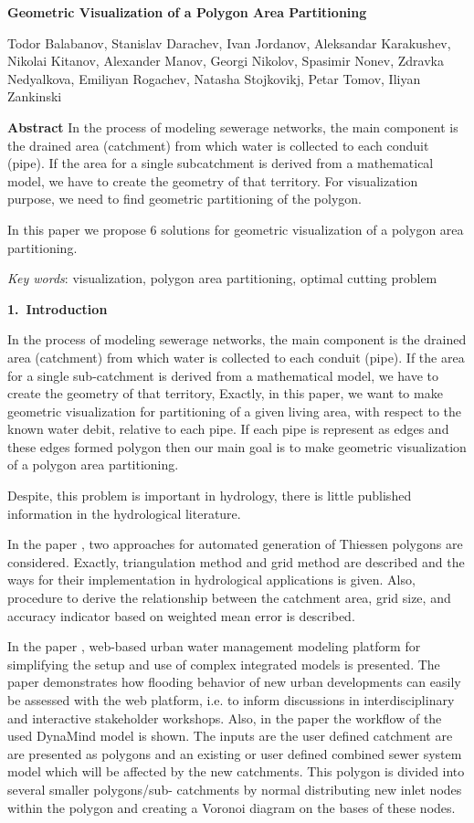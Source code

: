\documentclass[11pt,leqno]{book}
\newcommand{\sect}[1]{\vskip7mm\par{\large \bf #1}}
\begin{document}
%
\begin{center}
\textbf{\LARGE Geometric Visualization of a Polygon Area Partitioning}

\vspace*{5mm}
%
Todor Balabanov,
Stanislav Darachev,
Ivan Jordanov,
Aleksandar Karakushev,
Nikolai Kitanov,
Alexander Manov,
Georgi Nikolov,
Spasimir Nonev,
Zdravka Nedyalkova,
Emiliyan Rogachev,
Natasha Stojkovikj,
Petar Tomov,
Iliyan Zankinski
%
\end{center}
%
\date{18-22 Sep 2017}
%
\sect{Abstract}
%
In the process of modeling sewerage networks, the main component is the drained area (catchment) from which water is collected to each conduit (pipe). If the area for a single subcatchment is derived from a mathematical model, we have to create the geometry of that territory. For visualization purpose, we need to find geometric partitioning of the polygon.

In this paper we propose 6 solutions for geometric visualization of a polygon area partitioning.

\textit{Key words}: visualization, polygon area partitioning, optimal cutting problem

\sect{1.~Introduction}

In the process of modeling sewerage networks, the main component is the drained area (catchment) from which water is collected to each conduit (pipe). If the area for a single sub-catchment is derived from a mathematical model, we have to create the geometry of that territory, Exactly, in this paper, we want to make geometric visualization for partitioning of a given living area, with respect to the known water debit, relative to each pipe. If each pipe is represent as edges and these edges formed polygon  then our main goal is to make geometric visualization of a polygon area partitioning.  

Despite, this problem is important in hydrology, there is little published information in the hydrological literature. 

In the paper \cite{han:bra:1}, two approaches for automated generation of  Thiessen polygons are considered. Exactly, triangulation method and grid method are described and the ways for their implementation in hydrological applications is given. Also, procedure to derive the relationship between the catchment area, grid size, and accuracy indicator based on weighted mean error is described. 

In the paper \cite{mai:mik:1}, web-based urban water management modeling platform for simplifying the setup and use of complex integrated models is presented.  The paper demonstrates how flooding behavior of new urban developments can easily be assessed with the web platform, i.e. to inform discussions in interdisciplinary and interactive stakeholder workshops.  Also, in the paper the workﬂow of the used DynaMind model is shown. The inputs are the user deﬁned catchment are are presented as polygons and an existing or user deﬁned combined sewer system model which will be affected by the new catchments. This polygon is divided into several smaller polygons/sub- catchments by normal distributing new inlet nodes within the polygon and creating a Voronoi diagram on the bases of these nodes. 
\end{document}
